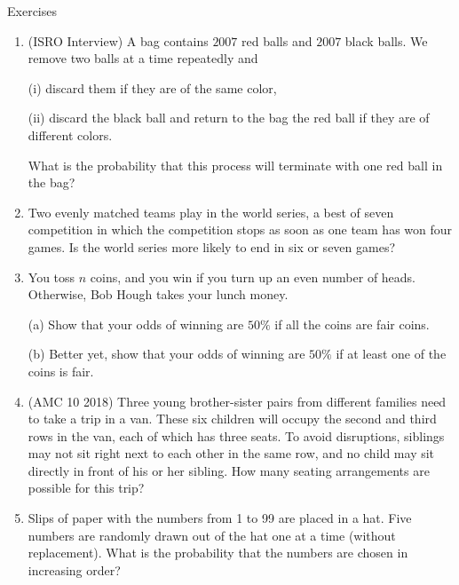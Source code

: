 \begin{xcb}{Exercises}
\begin{enumerate}
\begin{hint}
\end{hint}
\item (ISRO Interview)  A bag contains $2007$ red balls and $2007$ black balls. We remove two balls
at a time repeatedly and\par
(i) discard them if they are of the same color,\par
(ii) discard the black ball and return to the bag the red ball if they are of different
colors.\par
What is the probability that this process will terminate with one red ball in the bag?
\begin{hint}
\end{hint}
\item {} Two evenly matched teams play in the world series, a best of seven competition in which the competition stops as soon as one team has won four games. Is the world series more likely to end in six or seven games?
\item You toss $n$ coins, and you win if you turn up an even number of heads. Otherwise, Bob Hough takes your lunch money.\par
(a)  Show that your odds of winning are $50\%$ if all the coins are fair coins.\par
(b)  Better yet, show that your odds of winning are $50\%$ if at least one of the coins is
fair.\par
\item(AMC 10 2018)  Three young brother-sister pairs from different families need to take a trip in a van. These six children will occupy the second and third rows in the van, each of which has three seats. To avoid disruptions, siblings may not sit right next to each other in the same row, and no child may sit directly in front of his or her sibling. How many seating arrangements are possible for this trip?
\item {} Slips of paper with the numbers from 1 to 99 are placed in a hat. Five numbers are randomly drawn out of the hat one at a time (without replacement). What is the probability that the numbers are chosen in increasing order?
\end{enumerate}
\end{xcb}

